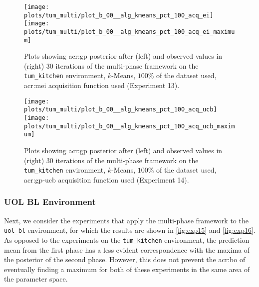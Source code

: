 \begin{figure}[t!]
	\centering
	\texttt{[image: plots/tum\_multi/plot\_b\_00\_\_alg\_kmeans\_pct\_100\_acq\_ei]}
	\texttt{[image: plots/tum\_multi/plot\_b\_00\_\_alg\_kmeans\_pct\_100\_acq\_ei\_maximum]}
	\caption{Plots showing \acrshort{acr:gp} posterior after (left) and observed values in (right) 30 iterations of the multi-phase framework on the \texttt{tum\_kitchen} environment, $k$-Means, $100\%$ of the dataset used, \acrshort{acr:mei} acquisition function used (Experiment 13).}
	\label{fig:exp13}
\end{figure}
\begin{figure}[t!]
	\centering
	\texttt{[image: plots/tum\_multi/plot\_b\_00\_\_alg\_kmeans\_pct\_100\_acq\_ucb]}
	\texttt{[image: plots/tum\_multi/plot\_b\_00\_\_alg\_kmeans\_pct\_100\_acq\_ucb\_maximum]}
	\caption{Plots showing \acrshort{acr:gp} posterior after (left) and observed values in (right) 30 iterations of the multi-phase framework on the \texttt{tum\_kitchen} environment, $k$-Means, $100\%$ of the dataset used, \acrshort{acr:gp-ucb} acquisition function used (Experiment 14).}
	\label{fig:exp14}
\end{figure}%

\newpage

\subsubsection{UOL BL Environment}
Next, we consider the experiments that apply the multi-phase framework to the \texttt{uol\_bl} environment, for which the results are shown in \autoref{fig:exp15} and \autoref{fig:exp16}.
As opposed to the experiments on the \texttt{tum\_kitchen} environment, the prediction mean from the first phase has a less evident correspondence with the maxima of the posterior of the second phase.
However, this does not prevent the \acrshort{acr:bo} of eventually finding a maximum for both of these experiments in the same area of the parameter space.

\vspace{12pt}
\noindent{}

